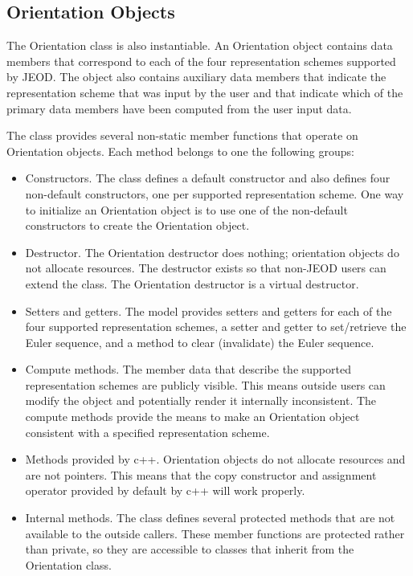 \subsection{Orientation Objects}
The Orientation class is also instantiable. An Orientation object contains data
members that correspond to each of the four representation schemes supported by
JEOD. The object also contains auxiliary data members that indicate the
representation scheme that was input by the user and that indicate which of the
primary data members have been computed from the user input data.

The class provides several non-static member functions that operate on
Orientation objects. Each method belongs to one the following groups:
\begin{itemize}
\item Constructors.
  The class defines a default constructor and also defines four non-default
  constructors, one per supported representation scheme. One way to initialize
  an Orientation object is to use one of the non-default constructors to
  create the Orientation object.
\item Destructor.
  The Orientation destructor does nothing; orientation objects do not allocate
  resources. The destructor exists so that non-JEOD users can extend the
  class. The Orientation destructor is a virtual destructor.
\item Setters and getters.
  The model provides setters and getters for each of the four supported
  representation schemes, a setter and getter to set/retrieve the Euler
  sequence, and a method to clear (invalidate) the Euler sequence. 
\item Compute methods.
  The member data that describe the supported representation schemes are
  publicly visible. This means outside users can modify the object and
  potentially render it internally inconsistent. The compute methods provide
  the means to make an Orientation object consistent with a specified
  representation scheme.
\item Methods provided by c++.
  Orientation objects do not allocate resources and are not pointers. This
  means that the copy constructor and assignment operator provided by
  default by c++ will work properly.
\item Internal methods.
  The class defines several protected methods that are not available to the
  outside callers. These member functions are protected rather than private,
  so they are accessible to classes that inherit from the Orientation class.
\end{itemize}


